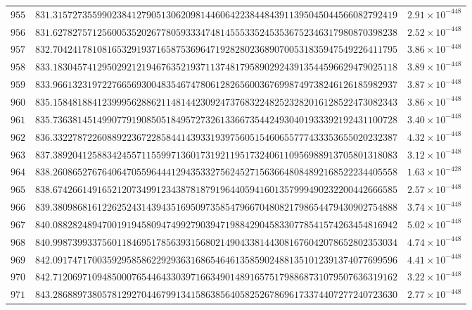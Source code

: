 \documentclass[12pt,reqno]{amsart}
\theoremstyle{remark}
\begin{document}
\begin{longtable}{clc}
$955$ & $831.3157273559902384127905130620981446064223844843911395045044566082792419$ & $2.91\times 10^{-448}$ \\
$956$ & $831.6278275712560053520267780593334748145553352453536752346317980870398238$ & $2.52\times 10^{-448}$ \\
$957$ & $832.7042417810816532919371658753696471928280236890700531835947549226411795$ & $3.86\times 10^{-448}$ \\
$958$ & $833.1830457412950292121946763521937113748179589029243913544596629479025118$ & $3.89\times 10^{-448}$ \\
$959$ & $833.9661323197227665693004835467478061282656003676998749738246126185982937$ & $3.87\times 10^{-448}$ \\
$960$ & $835.1584818841239995628862114814423092473768322482523282016128522473082343$ & $3.86\times 10^{-448}$ \\
$961$ & $835.7363814514990779190850518495727326133667354424930401933392192431100728$ & $3.40\times 10^{-448}$ \\
$962$ & $836.3322787226088922367228584414393319397560515460655777433353655020232387$ & $4.32\times 10^{-448}$ \\
$963$ & $837.3892041258834245571155997136017319211951732406110956988913705801318083$ & $3.12\times 10^{-448}$ \\
$964$ & $838.2608652767640647055964441294353327562452715636648084892168522234405558$ & $1.63\times 10^{-428}$ \\
$965$ & $838.6742661491652120734991234387818791964405941601357999490232200442666585$ & $2.57\times 10^{-448}$ \\
$966$ & $839.3809868161226252431439435169509735854796670480821798654479430902754888$ & $3.74\times 10^{-448}$ \\
$967$ & $840.0882824894700191945809474992790394719884290458330778541574263454816942$ & $5.02\times 10^{-448}$ \\
$968$ & $840.9987399337560118469517856393156802149043381443081676042078652802353034$ & $4.74\times 10^{-448}$ \\
$969$ & $842.0917471700359295858622929363168654646135859024881351012391374077699596$ & $4.41\times 10^{-448}$ \\
$970$ & $842.7120697109485000765446433039716634901489165751798868731079507636319162$ & $3.22\times 10^{-448}$ \\
$971$ & $843.2868897380578129270446799134158638564058252678696173374407277240723630$ & $2.77\times 10^{-448}$ \\

\end{longtable}
\end{document}
